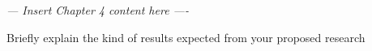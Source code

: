 \textit{--- Insert Chapter 4 content here ----}

Briefly explain the kind of results expected from your proposed research
